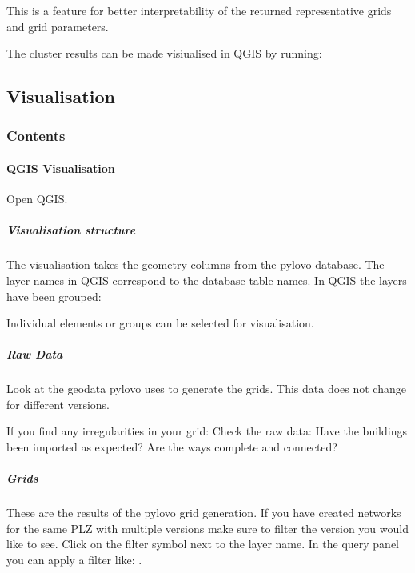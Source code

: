 \documentclass[letterpaper,10pt,english]{sphinxmanual}
\let\sphinxpxdimen\pdfpxdimen\else\newdimen\sphinxpxdimen
\begin{document}
\sphinxAtStartPar
This is a feature for better interpretability of the returned representative grids and grid parameters.

\sphinxAtStartPar
The cluster results can be made visiualised in QGIS by running:

\sphinxstepscope


\subsection{Visualisation}
\label{\detokenize{visualisation/index:visualisation}}\label{\detokenize{visualisation/index::doc}}

\subsubsection{Contents}
\label{\detokenize{visualisation/index:contents}}
\sphinxstepscope


\paragraph{QGIS Visualisation}
\label{\detokenize{visualisation/qgis/qgis:qgis-visualisation}}\label{\detokenize{visualisation/qgis/qgis::doc}}
\sphinxAtStartPar
Open QGIS.


\subparagraph{Visualisation structure}
\label{\detokenize{visualisation/qgis/qgis:visualisation-structure}}
\sphinxAtStartPar
The visualisation takes the geometry columns from the pylovo database. The layer names in QGIS correspond to the
database table names. In QGIS the layers have been grouped:

\noindent\sphinxincludegraphics[width=200\sphinxpxdimen]{{layer_menu}.png}

\sphinxAtStartPar
Individual elements or groups can be selected for visualisation.


\subparagraph{Raw Data}
\label{\detokenize{visualisation/qgis/qgis:raw-data}}
\sphinxAtStartPar
Look at the geodata pylovo uses to generate the grids. This data does not change for different versions.

\noindent\sphinxincludegraphics[width=600\sphinxpxdimen]{{qgis5}.png}

\sphinxAtStartPar
If you find any irregularities in your grid:
Check the raw data: Have the buildings been imported as expected? Are the ways complete and connected?


\subparagraph{Grids}
\label{\detokenize{visualisation/qgis/qgis:grids}}
\sphinxAtStartPar
These are the results of the pylovo grid generation. If you have created networks for the same PLZ with multiple
versions
make sure to filter the version you would like to see.
Click on the filter symbol next to the layer name. In the query panel you can apply a filter like:
.
\end{document}
